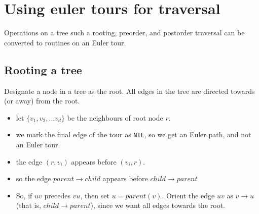 \section{Using euler tours for traversal}
Operations on a tree such a rooting, preorder, and postorder traversal
can be converted to routines on an Euler tour.

\subsection{Rooting a tree}
Designate a node in a tree as the root. All edges in the tree are
directed towards (or away) from the root.

\begin{itemize}
\item let $\{v_1, v_2, \dots v_d\}$ be the neighbours of root node $r$. 
\item we mark the final edge of the tour as \texttt{NIL}, so we get an
Euler path, and not an Euler tour.
\item the edge $(r, v_i)$ appears before $(v_i, r)$.
\item so the edge $parent \to child$ appears before $child \to parent$
\item So, if $uv$ precedes $vu$, then set $u = parent(v)$. Orient the
edge $uv$ as $v \to u$ (that is, $child \to parent$), since we want all edges towards the root.
\end{itemize}
